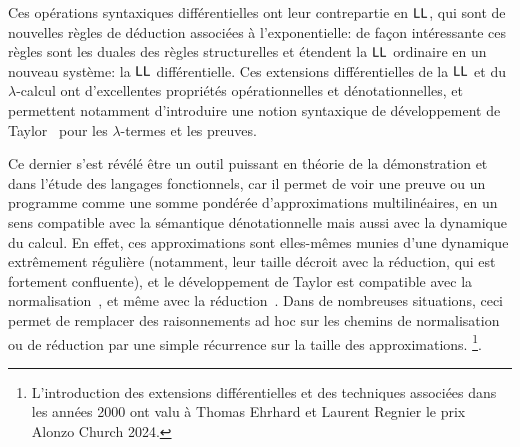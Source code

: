 \documentclass[a4]{article}
\begin{document}
Ces opérations syntaxiques différentielles ont leur contrepartie en
$\hbox{\textsf{LL}}$, qui sont de nouvelles règles de déduction associées à
l'exponentielle: de façon intéressante ces règles sont les duales des
règles structurelles et étendent la $\hbox{\textsf{LL}}$ ordinaire en un nouveau
système: la $\hbox{\textsf{LL}}$ différentielle.
%
Ces extensions différentielles de la $\hbox{\textsf{LL}}$ et du $\lambda$-calcul ont
d'excellentes propriétés opérationnelles et dénotationnelles, et
permettent notamment d'introduire une notion syntaxique de
développement de Taylor~\cite{EhrhardRegnier06a} pour les $\lambda$-termes et
les preuves.

Ce dernier s'est révélé être un outil puissant en théorie de la
démonstration et dans l'étude des langages fonctionnels, car
il permet de voir une preuve ou un programme comme une somme pondérée
d’approximations multilinéaires, en un sens compatible avec la sémantique
dénotationnelle mais aussi avec la dynamique du calcul.
%
En effet, ces approximations sont elles-mêmes munies d’une dynamique
extrêmement régulière (notamment, leur taille décroit avec la réduction,
qui est fortement confluente), et le développement de Taylor est compatible
avec la normalisation~\cite{EhrhardRegnier06b}, et même avec la
réduction~\cite{Vaux19}.
%
Dans de nombreuses situations, ceci permet de remplacer des raisonnements
ad hoc sur les chemins de normalisation ou de réduction par une simple
récurrence sur la taille des approximations.
%
\footnote{L'introduction des extensions différentielles et des techniques
    associées dans les années 2000 ont valu à Thomas Ehrhard et Laurent Regnier
    le prix Alonzo Church 2024.}.



\end{document}
